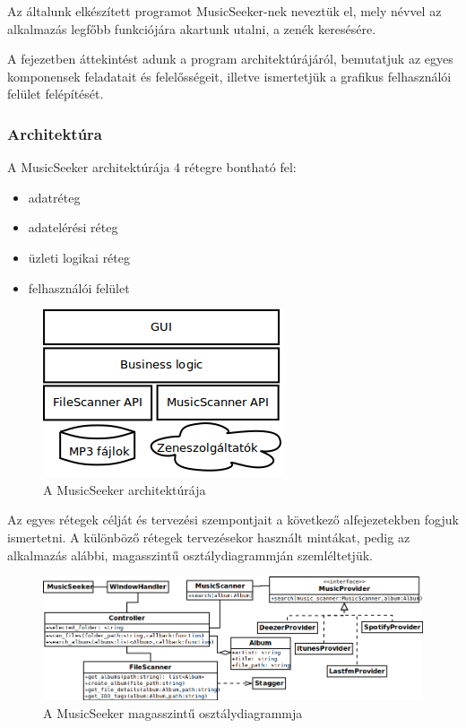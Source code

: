 Az általunk elkészített programot MusicSeeker-nek neveztük el, mely névvel az alkalmazás legfőbb funkciójára akartunk utalni, a zenék keresésére.

A fejezetben áttekintést adunk a program architektúrájáról, bemutatjuk az egyes komponensek feladatait és felelősségeit, illetve ismertetjük a grafikus felhasználói felület felépítését.

\subsubsection{Architektúra}
\label{ssub:architektura}

A MusicSeeker architektúrája 4 rétegre bontható fel:

\begin{itemize}
	\item adatréteg
	\item adatelérési réteg
	\item üzleti logikai réteg
	\item felhasználói felület
\end{itemize}

\begin{figure}[htp]
\centering
\includegraphics[scale=0.6]{img/architecture.png}
\caption{A MusicSeeker architektúrája}
\label{fig:architecture}
\end{figure}

Az egyes rétegek célját és tervezési szempontjait a következő alfejezetekben fogjuk ismertetni. A különböző rétegek tervezésekor használt mintákat, pedig az alkalmazás alábbi, magasszintű osztálydiagrammján szemléltetjük.

\begin{figure}[htp]
\centering
\includegraphics[scale=0.4]{img/class.png}
\caption{A MusicSeeker magasszintű osztálydiagrammja}
\label{fig:class}
\end{figure}


